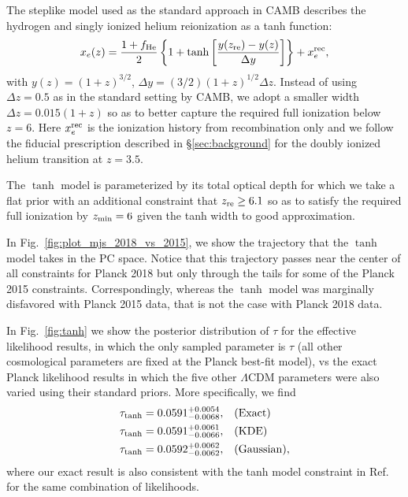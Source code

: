 \documentclass[aps,prd,twocolumn,amsmath,amssymb,showpacs,floatfix,superscriptaddress,nofootinbib]{revtex4-1}
\newcommand{\reffig}[1]{Fig.~\ref{fig:#1}}
\begin{document}
The steplike model used as the standard approach in CAMB describes the hydrogen and singly ionized helium reionization as a tanh function:
%
 \begin{equation}
x_e(z) = \frac{1+f_{\rm He}}{2}\left\{  1+ \tanh\left[ \frac{y(z_{\rm re})-y(z)}{\Delta y} \right] \right\} + x_e^{\rm rec},
 \label{eqn:tanh_1D}
 \end{equation}
 with $y(z)=(1+z)^{3/2}$, $\Delta y=(3/2)(1+z)^{1/2}\Delta z$. Instead of using $\Delta z = 0.5$ as in the standard setting by CAMB, we adopt a smaller width $\Delta z = 0.015(1+z)$ so as to better capture the required full ionization below $z=6$. Here $x_e^{\rm rec}$ is the ionization history from recombination only and we follow the fiducial prescription described in \S \ref{sec:background} for the 
 doubly ionized helium transition at $z=3.5$.
 

The $\tanh$ model is parameterized by its total optical depth for which we take a flat prior 
with an additional constraint that $z_{\rm re}\ge 6.1$ so as to  satisfy the  required full ionization by $z_{\rm min}=6$ given the tanh width to good approximation.

In Fig.~\ref{fig:plot_mjs_2018_vs_2015}, we show the trajectory that the $\tanh$ model takes in the PC space. Notice that this trajectory passes near the center of all constraints for Planck 2018 but only through the tails for some of the Planck 2015 constraints. Correspondingly, whereas the $\tanh$ model was marginally disfavored with Planck 2015 data, that is not the case with Planck 2018 data. 

 
In \reffig{tanh} we show the posterior distribution of $\tau$ for the effective likelihood results, in which the only sampled parameter is $\tau$ (all other cosmological parameters are fixed at the Planck best-fit model), vs the exact Planck likelihood results in which the five other $\Lambda$CDM parameters were also varied using their standard priors. More specifically, we find
%
\begin{align}
    \tau_{\mathrm{tanh}} = 0.0591_{-0.0068}^{+0.0054}, & \quad (\mathrm{Exact})\nonumber \\
    \tau_{\rm tanh} = 0.0591_{-0.0066}^{+0.0061}, & \quad  (\mathrm{KDE}) \nonumber \\
    \tau_{\rm tanh} = 0.0592_{-0.0062}^{+0.0062}, & \quad  (\mathrm{Gaussian}),
\end{align}
%
where our exact result is also consistent with the tanh model constraint in Ref.~\cite{Pagano:2019tci} for the same combination of likelihoods.
\end{document}
